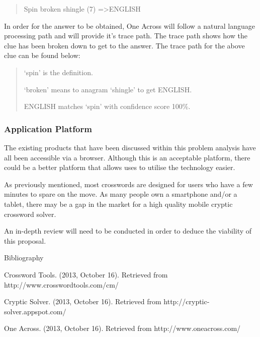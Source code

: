\begin{quote}
Spin broken shingle (7) =\textgreater  ENGLISH
\end{quote}

In order for the answer to be obtained, One Across will follow a natural 
language processing path and will provide it’s trace path. The trace path shows
how the clue has been broken down to get to the answer. The trace path for the 
above clue can be found below:

\begin{quote}
`spin' is the definition.

`broken' means to anagram `shingle' to get ENGLISH.

ENGLISH matches `spin' with confidence score 100\%.
\end{quote}

\subsubsection{Application Platform}

The existing products that have been discussed within this problem analysis 
have all been accessible via a browser. Although this is an acceptable 
platform, there could be a better platform that allows uses to utilise the 
technology easier.

As previously mentioned, most crosswords are designed for users who have a few 
minutes to spare on the move. As many people own a smartphone and/or a tablet, 
there may be a gap in the market for a high quality mobile cryptic crossword 
solver.

An in-depth review will need to be conducted in order to deduce the viability 
of this proposal.






Bibliography

Crossword Tools. (2013, October 16). Retrieved from http://www.crosswordtools.com/cm/

Cryptic Solver. (2013, October 16). Retrieved from http://cryptic-solver.appspot.com/

One Across. (2013, October 16). Retrieved from http://www.oneacross.com/